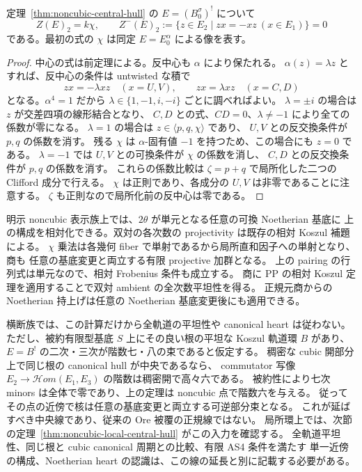 \begin{lemma}
\label{lem:noncubic-no-quadratic-anticenter}
定理~\ref{thm:noncubic-central-hull} の \(E=(B_0^\sigma)^!\) について
\[
 Z(E)_2=k\chi,\qquad
 Z^-(E)_2:=\{z\in E_2\mid zx=-xz\ (x\in E_1)\}=0
\]
である。最初の式の \(\chi\) は同定 \(E=E_0^\alpha\) による像を表す。
\end{lemma}
\begin{proof}
中心の式は前定理による。反中心も \(\alpha\) により保たれる。
\(\alpha(z)=\lambda z\) とすれば、反中心の条件は untwisted な積で
\[
 zx=-\lambda xz\quad(x=U,V),\qquad
 zx=\lambda xz\quad(x=C,D)
\]
となる。\(\alpha^4=1\) だから \(\lambda\in\{1,-1,i,-i\}\) ごとに調べればよい。
\(\lambda=\pm i\) の場合は \(z\) が交差四項の線形結合となり、
\(C,D\) との式、\(CD=0\)、\(\lambda\ne-1\) により全ての係数が零になる。
\(\lambda=1\) の場合は \(z\in\langle p,q,\chi\rangle\) であり、
\(U,V\) との反交換条件が \(p,q\) の係数を消す。
残る \(\chi\) は \(\alpha\)-固有値 \(-1\) を持つため、この場合にも \(z=0\) である。
\(\lambda=-1\) では \(U,V\) との可換条件が \(\chi\) の係数を消し、
\(C,D\) との反交換条件が \(p,q\) の係数を消す。
これらの係数比較は \(\zeta=p+q\) で局所化した二つの Clifford 成分で行える。
\(\chi\) は正則であり、各成分の \(U,V\) は非零であることに注意する。
\(\zeta\) も正則なので局所化前の反中心は零である。
\end{proof}


\begin{remark}[相対化と横断族への適用で分ける入力]
明示 noncubic 表示族上では、\(2\theta\) が単元となる任意の可換 Noetherian 基底に
上の構成を相対化できる。双対の各次数の projectivity は既存の相対 Koszul 補題による。
\(\chi\) 乗法は各幾何 fiber で単射であるから局所直和因子への単射となり、商も
任意の基底変更と両立する有限 projective 加群となる。
上の pairing の行列式は単元なので、相対 Frobenius 条件も成立する。
商に PP の相対 Koszul 定理を適用することで双対 ambient の全次数平坦性を得る。
正規元商からの Noetherian 持上げは任意の Noetherian 基底変更後にも適用できる。

横断族では、この計算だけから全軌道の平坦性や canonical heart は従わない。
ただし、被約有限型基底 \(S\) 上にその良い根の平坦な Koszul 軌道環 \(B\) があり、
\(E=B^!\) の二次・三次が階数七・八の束であると仮定する。
稠密な cubic 開部分上で同じ根の canonical hull が中央であるなら、
commutator 写像 \(E_2\to\mathcal Hom(E_1,E_3)\) の階数は稠密開で高々六である。
被約性により七次 minors は全体で零であり、上の定理は noncubic 点で階数六を与える。
従ってその点の近傍で核は任意の基底変更と両立する可逆部分束となる。
これが延ばすべき中央線であり、従来の Ore 被覆の正規線ではない。
局所環上では、次節の定理~\ref{thm:noncubic-local-central-hull} がこの入力を確認する。
全軌道平坦性、同じ根と cubic canonical 周期との比較、有限 AS4 条件を満たす
単一近傍の構成、Noetherian heart の認識は、この線の延長と別に記載する必要がある。
\end{remark}
